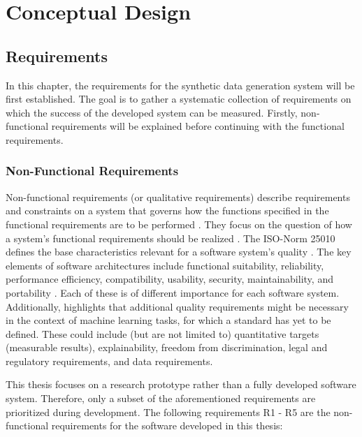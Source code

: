 \chapter{Conceptual Design}
\label{ch:conceptualDesign}

\section{Requirements}
\label{ch:requirements}

In this chapter, the requirements for the synthetic data generation system will be first established.
The goal is to gather a systematic collection of requirements on which the success of the developed system can be measured.
Firstly, non-functional requirements will be explained before continuing with the functional requirements.


\subsection*{Non-Functional Requirements}

Non-functional requirements (or qualitative requirements) describe requirements and constraints on a system that governs how the functions specified in the functional requirements are to be performed \cite{broy2021EinfuehrungSoftwaretechnik}.
They focus on the question of how a system's functional requirements should be realized \cite{broy2021EinfuehrungSoftwaretechnik}.
The ISO-Norm 25010 \cite{iso/iecSystemsSoftwareEngineering} defines the base characteristics relevant for a software system's quality \cite{haoues2017GuidelineSoftwareArchitecture}.
The key elements of software architectures include functional suitability, reliability, performance efficiency, compatibility, usability, security, maintainability, and portability \cite{haoues2017GuidelineSoftwareArchitecture}.
Each of these is of different importance for each software system.
Additionally, \cite{vogelsang2019RequirementsEngineeringMachine} highlights that additional quality requirements might be necessary in the context of machine learning tasks, for which a standard has yet to be defined.
These could include (but are not limited to) quantitative targets (\ie measurable results), explainability, freedom from discrimination, legal and regulatory requirements, and data requirements.

This thesis focuses on a research prototype rather than a fully developed software system.
Therefore, only a subset of the aforementioned requirements are prioritized during development.
The following requirements R1 - R5 are the non-functional requirements for the software developed in this thesis:

